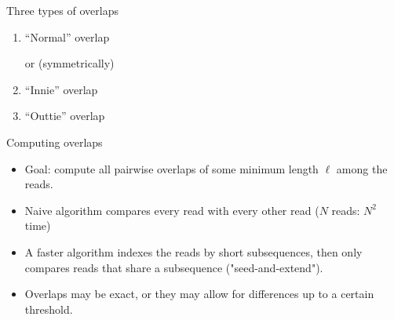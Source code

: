 \documentclass[xcolor=dvipsnames]{beamer}
\begin{document}
\begin{frame}{Three types of overlaps}
	\begin{enumerate}
		\item ``Normal'' overlap
			\begin{center}

				\vspace{3mm}
				or (symmetrically)
				\vspace{3mm}

			\end{center}
		\item ``Innie'' overlap
			\begin{center}  \end{center}
		\item ``Outtie'' overlap
			\begin{center}  \end{center}
	\end{enumerate}
\end{frame}


\begin{frame}{Computing overlaps}
	\begin{itemize}
		\item Goal: compute all pairwise overlaps of some minimum length $\ell$
		among the reads.
		\item Naive algorithm compares every read with every other read ($N$
		reads: $N^2$ time)
		\item A faster algorithm indexes the reads by short subsequences, then
		only compares reads that share a subsequence ("seed-and-extend").
		\item Overlaps may be exact, or they may allow for differences up to a
		certain threshold.
	\end{itemize}
\end{frame}
\end{document}
